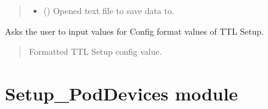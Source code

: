 \documentclass[letterpaper,10pt,english]{sphinxmanual}
\begin{document}
\begin{fulllineitems}
\begin{fulllineitems}
\begin{quote}
\begin{description}
\begin{itemize}
\item {} 
\sphinxAtStartPar
{} () \textendash{} Opened text file to save data to.

\end{itemize}

\end{description}\end{quote}

\end{fulllineitems}


\begin{fulllineitems}
\label{\detokenize{Setup_8480SC:Setup_8480SC.Setup_8480SC._TtlSetup}}
\pysigstartsignatures
{}
\pysigstopsignatures
\sphinxAtStartPar
Asks the user to input values for Config format values of TTL Setup.
\begin{quote}\begin{description}
\sphinxAtStartPar
Formatted TTL Setup config value.

\end{description}\end{quote}

\end{fulllineitems}


\end{fulllineitems}


\sphinxstepscope


\section{Setup\_PodDevices module}
\label{\detokenize{Setup_PodDevices:module-Setup_PodDevices}}\label{\detokenize{Setup_PodDevices:setup-poddevices-module}}\label{\detokenize{Setup_PodDevices::doc}}
\end{document}
